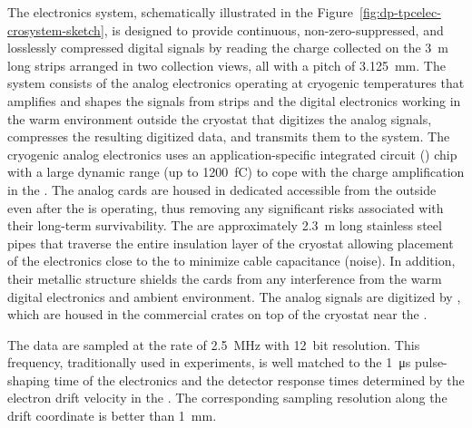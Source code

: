 The  electronics system, schematically illustrated in the Figure~\ref{fig:dp-tpcelec-crosystem-sketch}, is designed to provide continuous, non-zero-suppressed, and losslessly compressed digital signals by reading the charge collected on the \SI{3}{m} long  strips arranged in two collection views, all with a pitch of \SI{3.125}{mm}. The system consists of the  analog electronics operating at cryogenic temperatures that amplifies and shapes the signals from  strips and the digital electronics working in the warm environment outside the cryostat that digitizes the analog signals, compresses the resulting digitized data, and transmits them to the  system.  The cryogenic  analog electronics uses an application-specific integrated circuit () chip with a large dynamic range (up to \SI{1200}{fC}) to cope with the charge amplification in the . The analog  cards are housed in dedicated  accessible from the outside even after the  is operating, thus removing any significant risks associated with their long-term survivability. The  are approximately \SI{2.3}{m} long stainless steel pipes that traverse the entire insulation layer of the cryostat allowing placement of the  electronics close to the  to minimize cable capacitance (noise).  In addition, their metallic structure shields the  cards from any interference from the warm digital electronics and ambient environment. The analog signals are digitized by , which are housed in the commercial  crates on top of the cryostat near the . 

The  data are sampled at the rate of \SI{2.5}{MHz} with \SI{12}{bit} resolution. This frequency, traditionally used in \lartpc experiments, is well matched to the \SI{1}{\micro\second} pulse-shaping time of the  electronics and the detector response times determined by the electron drift velocity in the \lar. The corresponding sampling resolution along the drift coordinate is better than \SI{1}{\mm}. 

